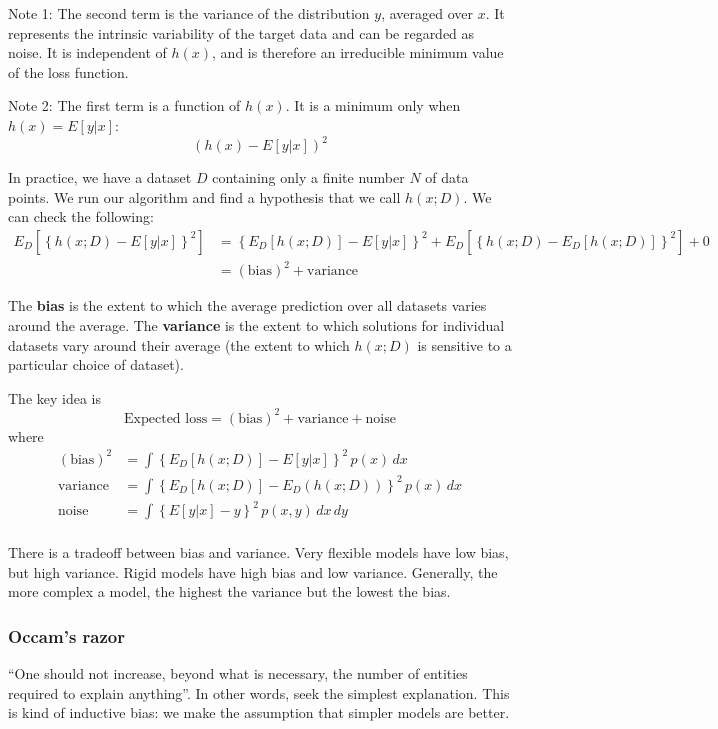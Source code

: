\documentclass[a4paper,12pt]{article}
\begin{document}
Note 1: The second term is the variance of the distribution $y$, averaged over $x$. It represents the intrinsic variability of the target data and can be regarded as noise. It is independent of $h(x)$, and is therefore an irreducible minimum value of the loss function. 

Note 2: The first term is a function of $h(x)$. It is a minimum only when $h(x) = E[y|x]$: 
$$(h(x) - E[y|x])^2$$

In practice, we have a dataset $D$ containing only a finite number $N$ of data points. We run our algorithm and find a hypothesis that we call $h(x; D)$. We can check the following: 
\begin{align*}
E_D\left[\left\{ h(x; D) - E[y|x] \right\}^2\right] &= 
\left\{ E_D[h(x; D)] - E[y|x] \right\}^2 + E_D\left[\left\{ h(x; D) - E_D[h(x; D)] \right\}^2\right] + 0 \\
&= (\text{bias})^2 + \text{variance}
\end{align*}

The \textbf{bias} is the extent to which the average prediction over all datasets varies around the average. The \textbf{variance} is the extent to which solutions for individual datasets vary around their average (the extent to which $h(x; D)$ is sensitive to a particular choice of dataset). 

The key idea is 
$$\text{Expected loss} = (\text{bias})^2 + \text{variance} + \text{noise}$$
where
\begin{align*}
(\text{bias})^2 &= \int \left\{E_D[h(x; D)] - E[y|x]\right\}^2 \,p(x)\,dx\\
\text{variance} &= \int \left\{E_D[h(x; D)] - E_D(h(x;D))\right\}^2 \,p(x)\,dx\\
\text{noise} &= \int \left\{E[y|x] - y\right\}^2 \,p(x,y)\,dx\,dy\\
\end{align*}

There is a tradeoff between bias and variance. Very flexible models have low bias, but high variance. Rigid models have high bias and low variance. Generally, the more complex a model, the highest the variance but the lowest the bias. 

\subsubsection{Occam's razor}

``One should not increase, beyond what is necessary, the number of entities required to explain anything''. In other words, seek the simplest explanation. This is kind of inductive bias: we make the assumption that simpler models are better. 
\end{document}
